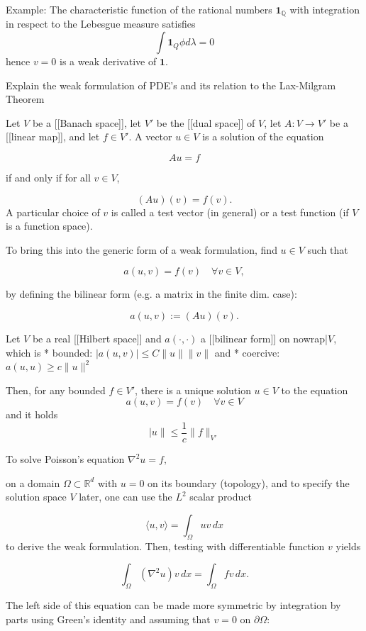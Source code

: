 Example:
The characteristic function of the rational numbers \( \mathbf{1}_{\mathbb{Q}} \) with integration in respect to the Lebesgue measure
satisfies
\[
    \int \mathbf{1}_{Q} \phi d\lambda = 0
\]
hence \( v = 0 \) is a weak derivative of \( \mathbf{1} \).



Explain the weak formulation of PDE's and its relation to the Lax-Milgram Theorem

Let \(V\) be a [[Banach space]], let \(V'\) be the [[dual space]] of \(V\), let \(A\colon V \to V'\) be a [[linear map]], and let \(f \in V'\). 
A vector \(u \in V\) is a solution of the equation

\[ Au = f \]

if and only if for all \(v \in V\),

\[(Au)(v) = f(v).\]
A particular choice of \(v\) is called a test vector (in general) or a test function (if \(V\) is a function space).

To bring this into the generic form of a weak formulation, find \(u\in V\) such that

\[
    a(u,v) = f(v) \quad \forall v \in V,
\]

by defining the bilinear form (e.g. a matrix in the finite dim. case):

\[
    a(u,v) := (Au)(v).
\]

Let \(V\) be a real [[Hilbert space]] and \(a( \cdot ,\cdot )\) a [[bilinear form]] on {{nowrap|\(V\),}} which is
* bounded: \(|a(u,v)| \le C \|u\| \|v\|\) and
* coercive: \(a(u,u) \ge c \|u\|^2\)

Then, for any bounded \(f\in V'\), there is a unique solution \(u\in V\) to the equation
\[
    a(u,v) = f(v) \quad \forall v \in V
\]
and it holds
\[
    |u\| \le \frac1c \|f\|_{V'}
\]

To solve Poisson's equation
\(\nabla^2 u = f,\)

on a domain \(\Omega\subset \mathbb R^d\) with \(u=0\) on its boundary (topology), 
and to specify the solution space \(V\) later, one can use the \(L^2\) scalar product

\[
    \langle u,v\rangle = \int_\Omega uv\,dx
\]
to derive the weak formulation. Then, testing with differentiable function \(v\) yields

\[
    \int_\Omega ( \nabla^2 u ) v \,dx = \int_\Omega fv \,dx.
\]

The left side of this equation can be made more symmetric by integration by parts using Green's identity 
and assuming that \(v=0\) on \(\partial\Omega\):

